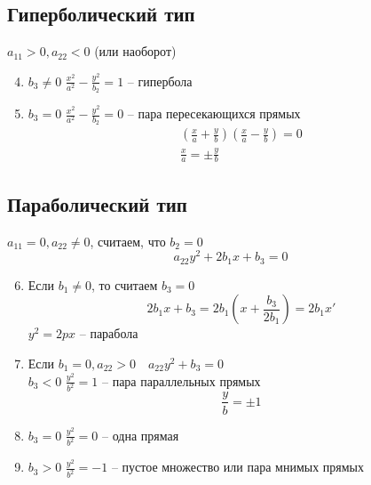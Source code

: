 \subsection{Гиперболический тип}
$a_{11}>0, a_{22} < 0$ (или наоборот)
\begin{enumerate}
    \setcounter{enumi}{3}
    \item $b_3 \neq 0$ $\frac{x^2}{a^2} - \frac{y^2}{b_2} = 1$ --  гипербола
    \item $b_3 = 0$ $\frac{x^2}{a^2} - \frac{y^2}{b_2} = 0$ -- пара пересекающихся прямых
          \begin{gather*}
              \left(\frac{x}{a}+\frac{y}{b}\right)\left(\frac{x}{a} - \frac{y}{b}\right)=0\\
              \frac{x}{a} = \pm \frac{y}{b}
          \end{gather*}
\end{enumerate}

\subsection{Параболический тип}
$a_{11} = 0, a_{22} \neq 0$, считаем, что $b_2 = 0$
\[a_{22}y^2 + 2b_1x + b_3 = 0\]
\begin{enumerate}
    \setcounter{enumi}{5}
    \item Если $b_1 \neq 0$, то считаем $b_3 = 0$
          \[2b_1x + b_3 = 2b_1\left(x + \frac{b_3}{2b_1}\right) = 2b_1 x'\]
          $y^2 = 2px$ -- парабола
    \item Если $b_1 = 0, a_{22} > 0 \quad a_{22}y^2 + b_3 = 0$ \\
          $b_3 < 0$ $\frac{y^2}{b^2} = 1$ -- пара параллельных прямых
          \[\frac{y}{b} = \pm 1\]
    \item $b_3=0$ $\frac{y^2}{b^2} =0$ -- одна прямая
    \item $b_3>0$ $\frac{y^2}{b^2} =-1$ -- пустое множество или пара мнимых прямых
\end{enumerate}